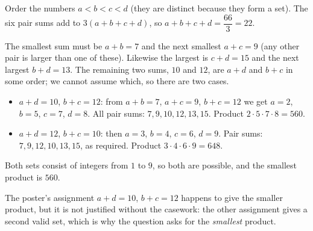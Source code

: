 Order the numbers $a<b<c<d$ (they are distinct because they form a set). The six pair sums add to $3(a+b+c+d)$, so $a+b+c+d=\dfrac{66}{3}=22$.

The smallest sum must be $a+b=7$ and the next smallest $a+c=9$ (any other pair is larger than one of these). Likewise the largest is $c+d=15$ and the next largest $b+d=13$. The remaining two sums, $10$ and $12$, are $a+d$ and $b+c$ in some order; we cannot assume which, so there are two cases.
\begin{itemize}
\item $a+d=10$, $b+c=12$: from $a+b=7$, $a+c=9$, $b+c=12$ we get $a=2$, $b=5$, $c=7$, $d=8$. All pair sums: $7,9,10,12,13,15$. Product $2\cdot5\cdot7\cdot8=560$.
\item $a+d=12$, $b+c=10$: then $a=3$, $b=4$, $c=6$, $d=9$. Pair sums: $7,9,12,10,13,15$, as required. Product $3\cdot4\cdot6\cdot9=648$.
\end{itemize}
Both sets consist of integers from $1$ to $9$, so both are possible, and the smallest product is $\boxed{560}$.

The poster's assignment $a+d=10$, $b+c=12$ happens to give the smaller product, but it is not justified without the casework: the other assignment gives a second valid set, which is why the question asks for the \emph{smallest} product.

